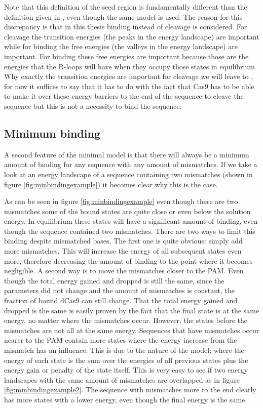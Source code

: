 Note that this definition of the seed region is fundamentally different than the definition given in \citep{Misha}, even though the same model is used. The reason for this discrepancy is that in this thesis binding instead of cleavage is considered. For cleavage the transition energies (the peaks in the energy landscape) are important while for binding the free energies (the valleys in the energy landscape) are important. For binding these free energies are important because those are the energies that the R-loops will have when they occupy those states in equilibrium. Why exactly the transition energies are important for cleavage we will leave to \citep{Misha}, for now it suffices to say that it has to do with the fact that Cas9 has to be able to make it over these energy barriers to the end of the sequence to cleave the sequence but this is not a necessity to bind the sequence.


\subsection{Minimum binding}

A second feature of the minimal model is that there will always be a minimum amount of binding for any sequence with any amount of mismatches. If we take a look at an energy landscape of a sequence containing two mismatches (shown in figure \ref{fig:minbindingexample}) it becomes clear why this is the case.


As can be seen in figure \ref{fig:minbindingexample} even though there are two mismatches some of the bound states are quite close or even below the solution energy. In equilibrium these states will have a significant amount of binding, even though the sequence contained two mismatches. There are two ways to limit this binding despite mismatched bases. The first one is quite obvious: simply add more mismatches. This will increase the energy of all subsequent states even more, therefore decreasing the amount of binding to the point where it becomes negligible. A second way is to move the mismatches closer to the PAM. Even though the total energy gained and dropped is still the same, since the parameters did not change and the amount of mismatches is constant, the fraction of bound dCas9 can still change. That the total energy gained and dropped is the same is easily proven by the fact that the final state is at the same energy, no matter where the mismatches occur. However, the states before the mismatches are not all at the same energy. Sequences that have mismatches occur nearer to the PAM contain more states where the energy increase from the mismatch has an influence. This is due to the nature of the model; where the energy of each state is the sum over the energies of all previous states plus the energy gain or penalty of the state itself. This is very easy to see if two energy landscapes with the same amount of mismatches are overlapped as in figure \ref{fig:minbindingexample2}. The sequence with mismatches more to the end clearly has more states with a lower energy, even though the final energy is the same.


